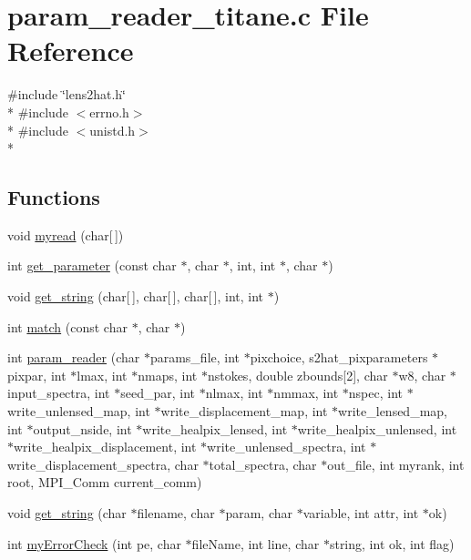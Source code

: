 \section{param\-\_\-reader\-\_\-titane.\-c File Reference}
\label{src_2common_2param__reader__titane_8c}
{\ttfamily \#include \char`\"{}lens2hat.\-h\char`\"{}}\\*
{\ttfamily \#include $<$errno.\-h$>$}\\*
{\ttfamily \#include $<$unistd.\-h$>$}\\*
\subsection*{Functions}
\begin{DoxyCompactItemize}
\item 
void \hyperlink{src_2common_2param__reader__titane_8c_a50c0568f618886d78986c4a9d6a23ba4}{myread} (char\mbox{[}$\,$\mbox{]})
\item 
int \hyperlink{src_2common_2param__reader__titane_8c_aa58f4ecc3318546d08e4282c739db7a3}{get\-\_\-parameter} (const char $\ast$, char $\ast$, int, int $\ast$, char $\ast$)
\item 
void \hyperlink{src_2common_2param__reader__titane_8c_acdf8e6c6f50db79679922d3dbf74dd84}{get\-\_\-string} (char\mbox{[}$\,$\mbox{]}, char\mbox{[}$\,$\mbox{]}, char\mbox{[}$\,$\mbox{]}, int, int $\ast$)
\item 
int \hyperlink{src_2common_2param__reader__titane_8c_af71971b64e93dd85136d531400035e57}{match} (const char $\ast$, char $\ast$)
\item 
int \hyperlink{src_2common_2param__reader__titane_8c_ab6bacb8b57a4a9612bd4d7a8ec68dfb9}{param\-\_\-reader} (char $\ast$params\-\_\-file, int $\ast$pixchoice, s2hat\-\_\-pixparameters $\ast$pixpar, int $\ast$lmax, int $\ast$nmaps, int $\ast$nstokes, double zbounds\mbox{[}2\mbox{]}, char $\ast$w8, char $\ast$input\-\_\-spectra, int $\ast$seed\-\_\-par, int $\ast$nlmax, int $\ast$nmmax, int $\ast$nspec, int $\ast$write\-\_\-unlensed\-\_\-map, int $\ast$write\-\_\-displacement\-\_\-map, int $\ast$write\-\_\-lensed\-\_\-map, int $\ast$output\-\_\-nside, int $\ast$write\-\_\-healpix\-\_\-lensed, int $\ast$write\-\_\-healpix\-\_\-unlensed, int $\ast$write\-\_\-healpix\-\_\-displacement, int $\ast$write\-\_\-unlensed\-\_\-spectra, int $\ast$write\-\_\-displacement\-\_\-spectra, char $\ast$total\-\_\-spectra, char $\ast$out\-\_\-file, int myrank, int root, M\-P\-I\-\_\-\-Comm current\-\_\-comm)
\item 
void \hyperlink{src_2common_2param__reader__titane_8c_a1be51b19c79f5c49c6ce2128259fc093}{get\-\_\-string} (char $\ast$filename, char $\ast$param, char $\ast$variable, int attr, int $\ast$ok)
\item 
int \hyperlink{src_2common_2param__reader__titane_8c_a70bcbd531a6e4abc62d73f5b4532c2cc}{my\-Error\-Check} (int pe, char $\ast$file\-Name, int line, char $\ast$string, int ok, int flag)
\end{DoxyCompactItemize}


